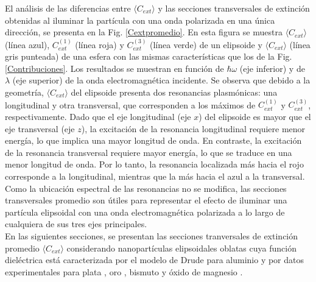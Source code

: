 El análisis de las diferencias entre $\langle C_{ext}\rangle$ y  las secciones transversales de extinción obtenidas al iluminar la partícula con una onda polarizada en una única dirección, se presenta en la Fig. \ref{Cextpromedio}. En esta figura se muestra $\langle C_{ext}\rangle$ (línea azul), $C_{ext}^{(1)}$ (línea roja) y $C_{ext}^{(3)}$ (línea verde) de un elipsoide y  $\langle C_{ext}\rangle$ (línea gris punteada) de una esfera con las mismas características que los de la Fig. \ref{Contribuciones}. Los resultados se muestran en función de $\hbar\omega$ (eje inferior) y de $\lambda$ (eje superior) de la onda electromagnética incidente. Se observa que debido a la geometría,
$\langle C_{ext}\rangle$ del elipsoide presenta dos resonancias plasmónicas: una longitudinal y otra transversal, que corresponden a los máximos de $C_{ext}^{(1)}$ y $C_{ext}^{(3)}$, respectivamente. Dado que el eje longitudinal (eje $x$) del elipsoide es mayor que el eje transversal (eje $z$), la excitación de la resonancia longitudinal requiere menor energía, lo que implica una mayor longitud de onda. En contraste, la excitación de la resonancia transversal requiere mayor energía, lo que se traduce en una menor longitud de onda. Por lo tanto, la resonancia localizada más hacia el rojo corresponde a la longitudinal, mientras que la más hacia el azul a la transversal. Como la ubicación espectral de las resonancias no se modifica, las secciones transversales promedio son útiles para representar el efecto de iluminar una partícula elipsoidal con una onda electromagnética polarizada a lo largo de cualquiera de sus tres ejes principales.\\

En las siguientes secciones, se presentan las secciones tranversales de extinción promedio  $\langle C_{ext}\rangle$ considerando nanopartículas elipsoidales oblatas cuya función dieléctrica está caracterizada por el modelo de Drude para aluminio \cite{Aluminio} y por datos experimentales para plata \cite{Plata}, oro \cite{Plata}, bismuto \cite{Bismuto} y  óxido de magnesio \cite{MgO}.


